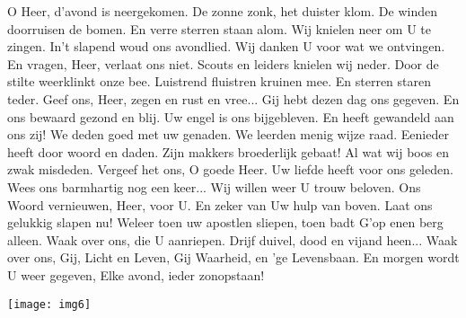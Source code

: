 \beginverse
O Heer, d'avond is neergekomen. De zonne zonk, het duister klom. De winden doorruisen de bomen. En verre sterren staan alom. Wij knielen neer om U te zingen. In't slapend woud ons avondlied. Wij danken U voor wat we ontvingen. En vragen, Heer, verlaat ons niet.
\endverse
\beginchorus
Scouts en leiders knielen wij neder. Door de stilte weerklinkt onze bee. Luistrend fluistren kruinen mee. En sterren staren teder. Geef ons, Heer, zegen en rust en vree...
\endchorus
\beginverse
Gij hebt dezen dag ons gegeven. En ons bewaard gezond en blij. Uw engel is ons bijgebleven. En heeft gewandeld aan ons zij! We deden goed met uw genaden. We leerden menig wijze raad. Eenieder heeft door woord en daden. Zijn makkers broederlijk gebaat!
\endverse
\beginverse
Al wat wij boos en zwak misdeden. Vergeef het ons, O goede Heer. Uw liefde heeft voor ons geleden. Wees ons barmhartig nog een keer... Wij willen weer U trouw beloven. Ons Woord vernieuwen, Heer, voor U. En zeker van Uw hulp van boven. Laat ons gelukkig slapen nu!
\endverse
\beginverse
Weleer toen uw apostlen sliepen, toen badt G'op enen berg alleen. Waak over ons, die U aanriepen. Drijf duivel, dood en vijand heen... Waak over ons, Gij, Licht en Leven, Gij Waarheid, en 'ge Levensbaan. En morgen wordt U weer gegeven, Elke avond, ieder zonopstaan!
\endverse
\endsong
\begin{intersong}
    \texttt{[image: img6]}
\end{intersong}